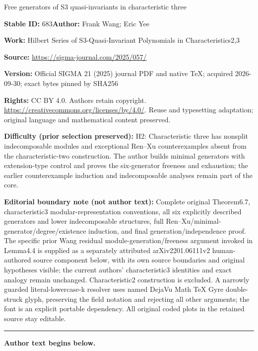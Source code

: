 \documentclass[11pt]{article}
\numberwithin{equation}{section}
\theoremstyle{definition}
\numberwithin{equation}{section}
\begin{document}
\begin{center}\Large Free generators of S3 quasi-invariants in characteristic three\end{center}
\noindent\textbf{Stable ID:} 683\quad\textbf{Author:} Frank Wang; Eric Yee\par
\noindent\textbf{Work:} Hilbert Series of S3-Quasi-Invariant Polynomials in Characteristics2,3\par
\noindent\textbf{Source:} \url{https://sigma-journal.com/2025/057/}\par
\noindent\textbf{Version:} Official SIGMA 21 (2025) journal PDF and native TeX; acquired 2026-09-30; exact bytes pinned by SHA256\par
\noindent\textbf{Rights:} CC BY 4.0. Authors retain copyright. \url{https://creativecommons.org/licenses/by/4.0/}. Reuse and typesetting adaptation; original language and mathematical content preserved.\par
\noindent\textbf{Difficulty (prior selection preserved):} {\CJKfont H2: Characteristic three has nonsplit indecomposable modules and exceptional Ren–Xu counterexamples absent from the characteristic-two construction. The author builds minimal generators with extension-type control and proves the six-generator freeness and exhaustion; the earlier counterexample induction and indecomposable analyses remain part of the core.}\par
\medskip\noindent\textbf{Editorial boundary note (not author text):} Complete original Theorem6.7, characteristic3 modular-representation conventions, all six explicitly described generators and lower indecomposable structures, full Ren–Xu/minimal-generator/degree/existence induction, and final generation/independence proof. The specific prior Wang residual module-generation/freeness argument invoked in Lemma4.4 is supplied as a separately attributed arXiv2201.06111v2 human-authored source component below, with its own source boundaries and original hypotheses visible; the current authors’ characteristic3 identities and exact analogy remain unchanged. Characteristic2 construction is excluded. A narrowly guarded literal-lowercase-k resolver uses named DejaVu Math TeX Gyre double-struck glyph, preserving the field notation and rejecting all other arguments; the font is an explicit portable dependency. All original coded plots in the retained source stay editable.\par
\medskip\hrule\medskip\noindent\textbf{Author text begins below.}\par
\setcounter{section}{1}
\end{document}
